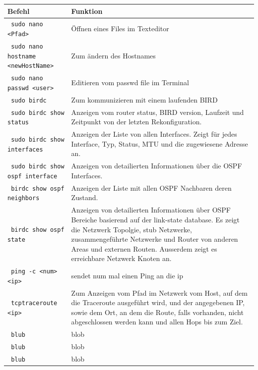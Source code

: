 \documentclass[11pt,titlepage]{article}
\begin{document}
\par\medskip 

\begin{tabular}{ |p{4cm}|p{10cm}|}
  \hline
  \textbf{Befehl} & \textbf{Funktion} \\
  \hline
  \lstinline! sudo nano <Pfad> ! & Öffnen eines Files im Texteditor \\
  \hline
  \lstinline! sudo nano hostname <newHostName>! & Zum ändern des Hostnames \\
  \hline
  \lstinline! sudo nano passwd <user> ! & Editieren vom passwd file im Terminal \\
  \hline
  \lstinline! sudo birdc ! & Zum kommunizieren mit einem laufenden BIRD \\
  \hline
  \lstinline! sudo birdc show status ! & Anzeigen vom router status, BIRD version, Laufzeit und Zeitpunkt von der letzten Rekonfiguration. \\
  \hline
  \lstinline! sudo birdc show interfaces ! & Anzeigen der Liste von allen Interfaces. Zeigt für jedes Interface, Typ, Status, MTU und die zugewiesene Adresse an.\\
  \hline
  \lstinline! sudo birdc show ospf interface ! & Anzeigen von detailierten Informationen über die OSPF Interfaces. \\
  \hline
  \lstinline! birdc show ospf neighbors ! & Anzeigen der Liste mit allen OSPF Nachbaren deren Zustand. \\
  \hline
  \lstinline! birdc show ospf state ! & Anzeigen von detailierten Informationen über OSPF Bereiche basierend auf der link-state database. Es zeigt die Netzwerk Topolgie, stub Netzwerke, zusammengeführte Netzwerke und Router von anderen Areas und externen Routen. Ausserdem zeigt es erreichbare Netzwerk Knoten an. \\
  \hline
  \lstinline! ping -c <num> <ip> ! & sendet num mal einen Ping an  die ip \\
  \hline
  \lstinline! tcptraceroute <ip> ! & Zum Anzeigen vom Pfad im Netzwerk vom Host, auf dem die Traceroute ausgeführt wird, und der angegebenen IP, sowie dem Ort, an dem die Route, falls vorhanden, nicht abgeschlossen werden kann und allen Hops bis zum Ziel. \\
  \hline
  \lstinline! blub ! & blob \\
  \hline
  \lstinline! blub ! & blob \\
  \hline
  \lstinline! blub ! & blob \\
  \hline
\end{tabular}
\end{document}
